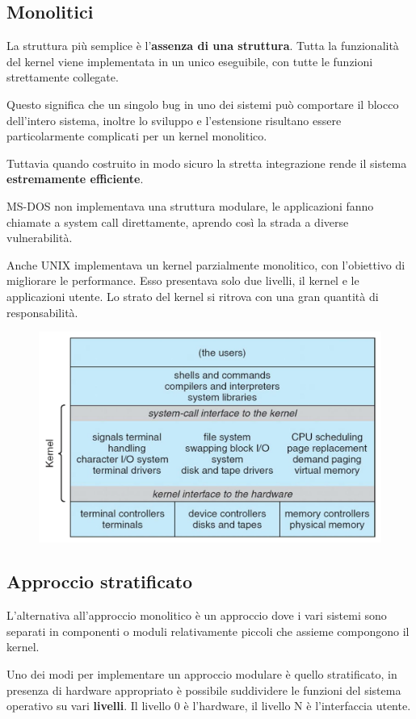 \subsection{Monolitici}
La struttura più semplice è l'\textbf{assenza di una struttura}. Tutta la funzionalità del kernel viene implementata in un unico eseguibile, con tutte le funzioni strettamente collegate.

\spacer
Questo significa che un singolo bug in uno dei sistemi può comportare il blocco dell'intero sistema, inoltre lo sviluppo e l'estensione risultano essere particolarmente complicati per un kernel monolitico.

Tuttavia quando costruito in modo sicuro la stretta integrazione rende il sistema \textbf{estremamente efficiente}.

\begin{note}
    MS-DOS non implementava una struttura modulare, le applicazioni fanno chiamate a system call direttamente, aprendo così la strada a diverse vulnerabilità.

    \spacer
    Anche UNIX implementava un kernel parzialmente monolitico, con l'obiettivo di migliorare le performance.
    Esso presentava solo due livelli, il kernel e le applicazioni utente. Lo strato del kernel si ritrova con una gran quantità di responsabilità.

    \begin{figure}[H]
        \centering
        \includegraphics[width=0.5\linewidth]{assets/unix-monolithic.png}
    \end{figure}
\end{note}

\subsection{Approccio stratificato}
L'alternativa all'approccio monolitico è un approccio dove i vari sistemi sono separati in componenti o moduli relativamente piccoli che assieme compongono il kernel.

\spacer
Uno dei modi per implementare un approccio modulare è quello stratificato, in presenza di hardware appropriato è possibile suddividere le funzioni del sistema operativo su vari \textbf{livelli}. Il livello 0 è l'hardware, il livello N è l'interfaccia utente.

